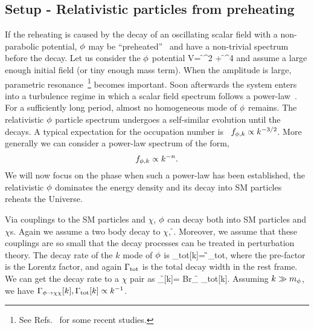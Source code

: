 \documentclass[superscriptaddress,aps,preprintnumbers,amsmath,showpacs,amssymb,prd,nofootinbib,reprint]{revtex4-1}
\begin{document}
{\subsection{Setup - Relativistic particles from preheating}
If the reheating is caused by the decay of an oscillating scalar field with a non-parabolic potential, $\phi$ may be ``preheated''~\cite{Traschen:1990sw,Kofman:1994rk,Shtanov:1994ce, Yoshimura:1995gc, Kasuya:1996np,Kofman:1997yn,Berges:2002cz} and have a non-trivial spectrum before the decay. 
Let us consider the $\phi$ potential
\beq 
V= \f^2 + \f^4
\eeq 
and assume a large enough initial field (or tiny enough mass term). 
When the amplitude is large, parametric resonance~\cite{Traschen:1990sw,Kofman:1994rk,Shtanov:1994ce, Yoshimura:1995gc, Kasuya:1996np,
  Kofman:1997yn,Berges:2002cz}\footnote{See Refs.~\cite{Mukhanov:2005sc, Dufaux:2006ee, Matsumoto:2007rd,
  Asaka:2010kv, Mukaida:2013xxa, Amin:2019qrx, Kitajima:2017peg,
  Agrawal:2018vin, Co:2018lka, Dror:2018pdh, Lozanov:2019jxc,
  Alonso-Alvarez:2019ssa,Moroi:2020bkq} for some recent studies.} becomes important. 
Soon afterwards the system enters into a turbulence regime in which a scalar field spectrum follows a power-law~\cite{Khlebnikov:1996mc,Micha:2002ey,Micha:2004bv,Lozanov:2017hjm}. 
For a sufficiently long period, almost no homogeneous mode of $\phi$ remains. The relativistic $\phi$ particle spectrum undergoes a self-similar evolution until the decays. A typical expectation for the occupation number is~\cite{Khlebnikov:1996mc,Micha:2002ey,Micha:2004bv,Lozanov:2017hjm} $f_{\phi,k}\propto k^{-3/2}$. More generally we can consider a power-law spectrum of the form, 
\begin{equation}
f_{\phi,k}\propto k^{-n}.
\end{equation}
We will now focus on the phase when such a power-law has been established, the relativistic $\phi$ dominates the energy density and its decay into SM particles reheats the Universe. 




Via couplings to the SM particles and $\chi$, $\phi$ can decay both into SM particles and $\chi$s. 
Again we assume a two body decay to $\chi$,
\beq \f \to \chi\chi.\eeq 
Moreover, we assume that these couplings are so small that the decay processes can be treated in perturbation theory.  
The decay rate of the $k$ mode of $\phi$ is 
\beq
\Gamma_{\rm tot}[k]=  \times \G_{\rm tot},
\eeq
where the pre-factor is the Lorentz factor, and again $\Gamma_{\rm tot}$ is the total decay width in the rest frame. 
We can get the decay rate to a $\chi$ pair as
\beq
\Gamma_{\f\to \chi\chi}[k]=  Br_{\f \to \chi\chi} \times \Gamma_{\rm tot}[k].
\eeq
Assuming $k\gg m_\phi$, we {have} $\Gamma_{\phi\to \chi\chi}[k],\Gamma_{\rm tot}[k]\propto k^{-1}$.


}
\end{document}
